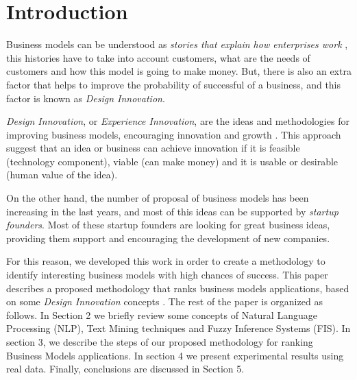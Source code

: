 
\chapter{Introduction}
\label{ch:intro}

Business models can be understood as \textit{stories that explain how enterprises work} \cite{magretta2002business}, this histories have to take into account customers, what are the needs of customers and how this model is going to make money. But, there is also an extra factor that helps to improve the probability of successful of a business, and this factor is known as \textit{Design Innovation}.

\textit{Design Innovation}, or \textit{Experience Innovation}, are the ideas and methodologies for improving business models, encouraging innovation and growth \cite{liedtka2015perspective}. This approach suggest that an idea or business can achieve innovation if it is feasible (technology component), viable (can make money) and it is usable or desirable (human value of the idea). 

On the other hand, the number of proposal of business models has been increasing in the last years, and most of this ideas can be supported by \textit{startup founders}. Most of these startup founders are looking for great business ideas, providing them support and encouraging the development of new companies.

For this reason, we developed this work in order to create a methodology to identify interesting business models with high chances of success. This paper describes a proposed methodology that ranks business models applications, based on some \textit{Design Innovation} concepts \cite{liedtka2015perspective}. The rest of the paper is organized as follows. In Section 2 we briefly review some concepts of Natural Language Processing (NLP), Text Mining techniques and Fuzzy Inference Systems (FIS). In section 3, we describe the steps of our proposed methodology for ranking Business Models applications. In section 4 we present experimental results using real data. Finally, conclusions are discussed in Section 5.  

